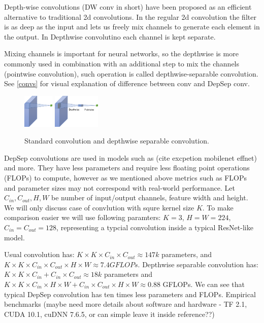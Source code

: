 Depth-wise convolutions (DW conv in short) have been proposed as an efficient alternative to traditional 2d convolutions. In the regular 2d convolution the filter is as deep as the input and lets us freely mix channels to generate each element in the output. In Depthwise convolutino each channel is kept separate. 

Mixing channels is important for  neural networks, so the depthwise is more commonly used in combination with an additional step to mix the channels (pointwise convolution), such operation is called depthwise-separable convolution. See \ref{convs} for visual explanation of difference between conv and DepSep conv. 

\begin{figure}[h]
    \centering
         \includegraphics[width=0.13\textwidth]{images/conv.pdf}
         \hfil
         \includegraphics[width=0.2\textwidth]{images/conv_DepSep.pdf}
    \caption{Standard convolution and depthwise separable convolution.}   \label{fig: convs}
    \end{figure}


DepSep convolutions are used in models such as (cite excpetion mobilenet effnet) and more. They have less parameters and require less floating point operations (FLOPs) to compute, however as we mentioned above metrics such as FLOPs and parameter sizes may not correspond with real-world performance. Let $C_{in}, C_{out}, H, W$ be number of input/output channels, feature width and height. We will only discuss case of convlution with squre kernel size $K$. To make comparison easier we will use following paramters: $K=3$, $H=W=224$, $C_{in} = C_{out}=128$, representing a typcial convolution inside a typical ResNet-like model.  

Usual convolution has: $ K \times K \times C_{in} \times C_{out} \approx 147k$ parameters, and $ K \times K \times C_{in} \times C_{out} \times H \times W \approx 7.4 GFLOPs$. Depthwise separable convolution has: $ K \times K \times C_{in} + C_{in} \times C_{out} \approx 18k$ parameters and $ K \times K \times C_{in} \times H \times W + C_{in} \times C_{out} \times H \times W \approx 0.88$ GFLOPs. We can see that typical DepSep convolution has ten times less parameters and FLOPs. Empirical benchmarks %
(maybe need more details about software and hardware - TF 2.1, CUDA 10.1, cuDNN 7.6.5, or can simple leave it inside reference??)

